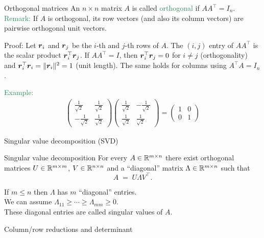 \documentclass{beamer}
\begin{document}
\begin{frame}{Orthogonal matrices}
An $n \times n$ matrix $A$ is called \textcolor{SeaGreen}{orthogonal} if  $AA^\top=I_n$.
\vskip 12pt
\textcolor{SeaGreen}{Remark:} If $A$ is orthogonal, its row vectors (and also its column vectors) are pairwise orthogonal unit vectors.\\[3mm]

\begin{small}Proof: Let $\boldsymbol r_i$ and $\boldsymbol r_j$ be the $i$-th and $j$-th rows of $A$.  
The $(i,j)$ entry of $AA^\top$ is the scalar product $\boldsymbol r_i^\top\boldsymbol r_j$.  
If $AA^\top=I$, then $\boldsymbol r_i^\top\boldsymbol r_j = 0$ for $i\neq j$ (orthogonality) and  
$\boldsymbol r_i^\top\boldsymbol r_i = \|\boldsymbol r_i\|^2 = 1$ (unit length).  
The same holds for columns using $A^\top A = I_n$.\end{small}
\vskip 12pt
\textcolor{SeaGreen}{Example:}
\begin{align*}
\begin{pmatrix}\tfrac{1}{\sqrt{2}}& \tfrac{1}{\sqrt{2}} \\
-\tfrac{1}{\sqrt{2}}& \tfrac{1}{\sqrt{2}}
\end{pmatrix}
\begin{pmatrix}
\tfrac{1}{\sqrt{2}}& -\tfrac{1}{\sqrt{2}}\\
\tfrac{1}{\sqrt{2}}& \tfrac{1}{\sqrt{2}}
\end{pmatrix}
=
\begin{pmatrix}1&  0\\
0 & 1
\end{pmatrix}
\end{align*}
\end{frame}

\begin{frame}{Singular value decomposition (SVD)}
\begin{alertblock}{Singular value decomposition}
	For every $A\in \mathbb R^{m\times n}$ there exist orthogonal matrices $U\in \mathbb R^{m\times m}$, $V\in \mathbb R^{n\times n}$ and a ``diagonal'' matrix $\Lambda\in \mathbb R^{m\times n}$ such that 	
	$$
	A\;=\;U\Lambda V^\top.
	$$
\end{alertblock}
	 
If $m\leq n$ then $\Lambda$ has $m$ ``diagonal'' entries.\\[4mm]
	 We can assume $\Lambda_{11}\geq \cdots \geq \Lambda_{mm}\geq 0$.\\[4mm]
	 These diagonal entries are called \alert{singular values} of $A$.
\end{frame}


\begin{frame} \begin{center}
	\alert{\Huge Column/row reductions and determinant}
\end{center}\end{frame}
\end{document}
